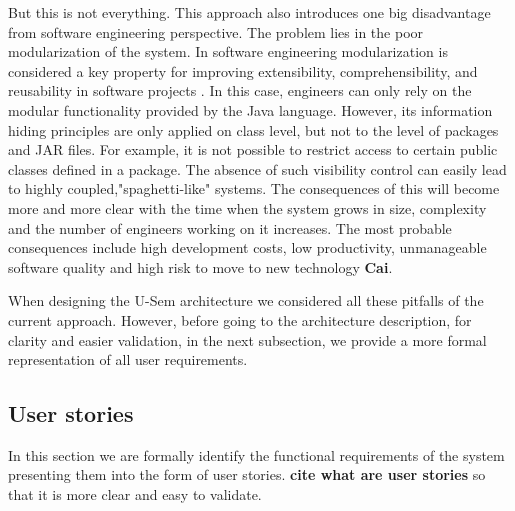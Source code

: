 But this is not everything. This approach also introduces one big disadvantage from software engineering perspective. The problem lies in the poor modularization of the system. In software engineering modularization is considered a key property for improving extensibility, comprehensibility, and reusability in software projects \cite{Parnas}. In this case, engineers can only rely on the modular functionality provided by the Java language. However, its information hiding principles are only applied on class level, but not to the level of packages and JAR files. For example, it is not possible to restrict access to certain public classes defined in a package. The absence of such visibility control can easily lead to highly coupled,"spaghetti-like" systems. The consequences of this will become more and more clear with the time when the system grows in size, complexity and the number of engineers working on it increases. The most probable consequences include high development costs, low productivity, unmanageable software quality and high risk to move to new technology \textbf{Cai}.

When designing the U-Sem architecture we considered all these pitfalls of the current approach. However, before going to the architecture description, for clarity and easier validation, in the next subsection, we provide a more formal representation of all user requirements.


\subsection{User stories}
In this section we are formally identify the functional requirements of the system presenting them into the form of user stories. \textbf{cite what are user stories} so that it is more clear and easy to validate.

